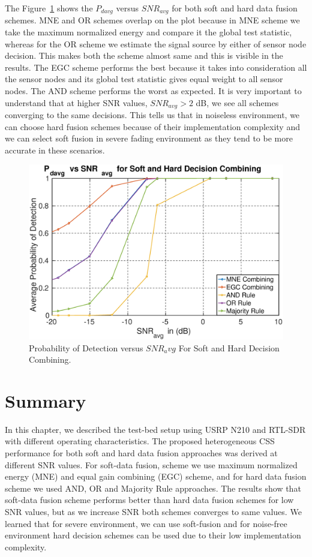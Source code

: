 The Figure~\ref{softpd} shows the $P_{davg}$ versus $SNR_{avg}$ for both soft and hard data fusion schemes. MNE and OR schemes overlap on the plot because in MNE scheme we take the maximum normalized energy and compare it the global test statistic, whereas for the OR scheme we estimate the signal source by either of sensor node decision. This makes both the scheme almost same and this is visible in the results. The EGC scheme performs the best because it takes into consideration all the sensor nodes and its global test statistic gives equal weight to all sensor nodes. The AND scheme performs the worst as expected. It is very important to understand that at higher SNR values, $SNR_{avg} > 2$ dB, we see all schemes converging to the same decisions. This tells us that in noiseless environment, we can choose hard fusion schemes because of their implementation complexity and we can select soft fusion in severe fading environment as they tend to be more accurate in these scenarios.
\begin{figure}[ht!]
	\centering
	\includegraphics[width=\textwidth,keepaspectratio]{images/Gill/figs/softnhardecisionpd.eps}
    \caption{Probability of Detection versus $SNR_avg$ For Soft and Hard Decision Combining.} 
\label{softpd}      
\end{figure}

\section{Summary}
In this chapter, we described the test-bed setup using USRP N210 and RTL-SDR with different operating characteristics. The proposed heterogeneous CSS performance for both soft and hard data fusion approaches was derived at different SNR values. For soft-data fusion, scheme we use maximum normalized energy (MNE) and equal gain combining (EGC) scheme, and for hard data fusion scheme we used AND, OR and Majority Rule approaches. The results show that soft-data fusion scheme performs better than hard data fusion schemes for low SNR values, but as we increase SNR both schemes converges to same values. We learned that for severe environment, we can use soft-fusion and for noise-free environment hard decision schemes can be used due to their low implementation complexity.

